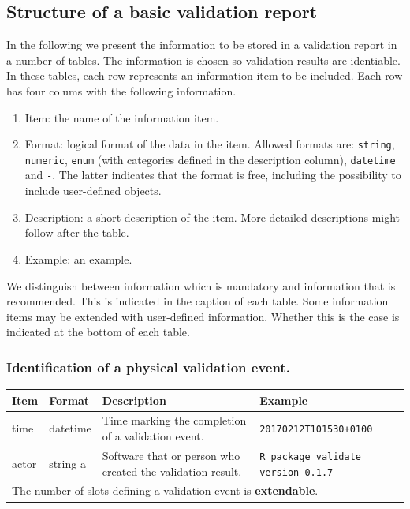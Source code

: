 \documentclass[a4paper, 11pt,titlepage]{article}
\newcommand{\code}[1]{\texttt{#1}}
\begin{document}
\subsection{Structure of a basic validation report}
\label{sect:basicreportstructure}
In the following we present the information to be stored in a validation report
in a number of tables. The information is chosen so validation results are
identiable. In these tables, each row represents an information item to be
included. Each row has four colums with the following information.
%
\begin{enumerate}
\item Item: the name of the information item.
\item Format: logical format of the data in the item. Allowed formats are: \code{string},
\code{numeric}, \code{enum} (with categories defined in the description
column), \code{datetime} and \code{-}. The latter indicates that the format is
free, including the possibility to include user-defined objects.
\item Description: a short description of the item. More detailed descriptions
might follow after the table.
\item Example: an example.
\end{enumerate}
%
We distinguish between information which is mandatory and information that
is recommended. This is indicated in the caption of each table. Some
information items may be extended with user-defined information. Whether
this is the case is indicated at the bottom of each table.


\subsubsection{Identification of a physical validation event.}
%
\begin{center}
\begin{tabular}{|lp{15mm}p{}p{}|}
\hline
\textbf{Item} & \textbf{Format} & \textbf{Description} &\textbf{Example}\\
\hline
time          & datetime & Time marking the completion of a validation event. & \code{20170212T101530+0100}\\
actor         & string        a  & Software that or person who created the validation result. & \code{R package validate version 0.1.7}\\
\hline
\multicolumn{4}{|l|}{The number of slots defining a validation event is \textbf{extendable}.
}\\
\hline
\end{tabular}
\end{center}
\end{document}
